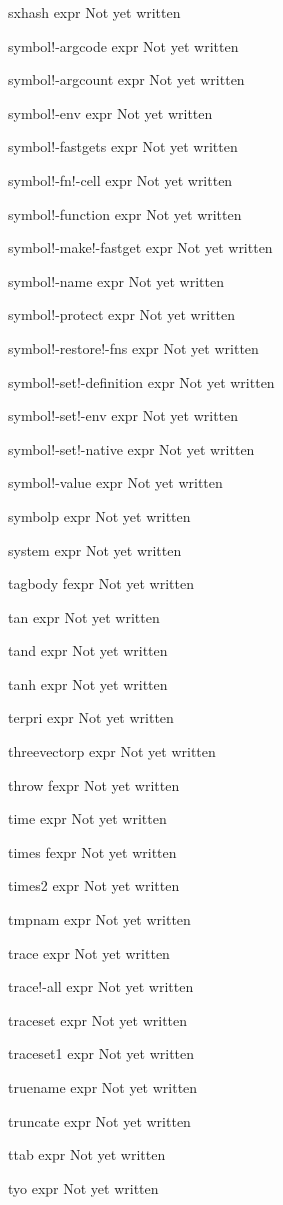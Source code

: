 \documentclass[a4paper,11pt]{article}
\begin{document}
\begin{description}
sxhash expr
Not yet written

symbol!-argcode expr
Not yet written

symbol!-argcount expr
Not yet written

symbol!-env expr
Not yet written

symbol!-fastgets expr
Not yet written

symbol!-fn!-cell expr
Not yet written

symbol!-function expr
Not yet written

symbol!-make!-fastget expr
Not yet written

symbol!-name expr
Not yet written

symbol!-protect expr
Not yet written

symbol!-restore!-fns expr
Not yet written

symbol!-set!-definition expr
Not yet written

symbol!-set!-env expr
Not yet written

symbol!-set!-native expr
Not yet written

symbol!-value expr
Not yet written

symbolp expr
Not yet written

system expr
Not yet written

tagbody fexpr
Not yet written

tan expr
Not yet written

tand expr
Not yet written

tanh expr
Not yet written

terpri expr
Not yet written

threevectorp expr
Not yet written

throw fexpr
Not yet written

time expr
Not yet written

times fexpr
Not yet written

times2 expr
Not yet written

tmpnam expr
Not yet written

trace expr
Not yet written

trace!-all expr
Not yet written

traceset expr
Not yet written

traceset1 expr
Not yet written

truename expr
Not yet written

truncate expr
Not yet written

ttab expr
Not yet written

tyo expr
Not yet written


\end{description}
\end{document}
